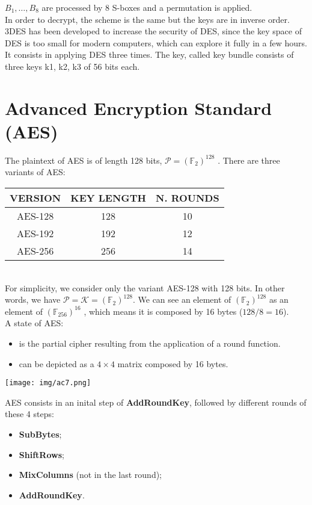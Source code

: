 \documentclass[a4paper, 10pt, titlepage]{article}
\begin{document}
$B_1, \dots, B_8$ are processed by 8 S-boxes and a permutation is applied. \\
In order to decrypt, the scheme is the same but the keys are in
inverse order. \medskip\\
3DES has been developed to increase the security of DES, since the key space of DES is too small for modern computers, which can explore it fully in a few hours. It consists in applying DES three times. The key, called key bundle consists of three keys k1, k2, k3 of 56 bits each.

\section{Advanced Encryption Standard (AES)}
The plaintext of AES is of length 128 bits, $\mathcal{P}= (\mathbb{F}_ 2)^{128}$ . There are three variants of AES: \medskip \\
\begin{tabular}{|c|c|c|}
\hline
VERSION & KEY LENGTH & N. ROUNDS \\
\hline AES-128 & 128 & 10 \\
AES-192 & 192 & 12 \\
AES-256 & 256 & 14 \\ \hline
\end{tabular} \medskip \\
For simplicity, we consider only the variant AES-128 with 128 bits.
In other words, we have $\mathcal{P} = \mathcal{K} = (\mathbb{F}_2) ^{128}$.
We can see an element of $(\mathbb{F}_2)^{128}$ as an element of $(\mathbb{F}_{256} )^{16}$ , which means it is composed by 16 bytes ($128/8=16$). \\
A state of AES:
\begin{itemize}
\item is the partial cipher resulting from the application of a round function.
\item can be depicted as a $4 \times 4$ matrix composed by 16 bytes.
\end{itemize}
\begin{center}
\texttt{[image: img/ac7.png]}
\end{center}
AES consists in an inital step of \textbf{AddRoundKey}, followed by different rounds of these 4 steps:
\begin{itemize}
\item \textbf{SubBytes};
\item \textbf{ShiftRows};
\item \textbf{MixColumns} (not in the last round);
\item \textbf{AddRoundKey}.
\end{itemize}
\end{document}
